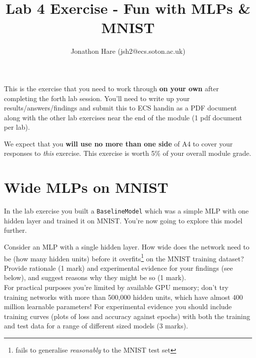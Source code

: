 \documentclass[a4paper]{article}
\begin{document}
\lstset{language=Python,upquote=true}

\setlength{\leftskip}{20pt}
\title{Lab 4 Exercise - Fun with MLPs \& MNIST}
\author{Jonathon Hare (jsh2@ecs.soton.ac.uk)}

\maketitle


This is the exercise that you need to work through \textbf{on your own} after completing the forth lab session. You'll need to write up your results/answers/findings and submit this to ECS handin as a PDF document along with the other lab exercises near the end of the module (1 pdf document per lab). 

We expect that you \textbf{will use no more than one side} of A4 to cover your responses to \emph{this} exercise. This exercise is worth 5\% of your overall module grade.

\section{Wide MLPs on MNIST}\label{wide}

In the lab exercise you built a \texttt{BaselineModel} which was a simple MLP with one hidden layer and trained it on MNIST. You're now going to explore this model further.

\begin{tcolorbox}[title=1.1 Wider MLPs (5 marks)]
Consider an MLP with a single hidden layer. How wide does the network need to be (how many hidden units) before it overfits\footnote{fails to generalise \emph{reasonably} to the MNIST test set} on the MNIST training dataset? Provide rationale (1 mark) and experimental evidence for your findings (see below), and suggest reasons why they might be so (1 mark).
\\[1em]
For practical purposes you're limited by available GPU memory; don't try training networks with more than 500,000 hidden units, which have almost 400 million learnable parameters! For experimental evidence you should include training curves (plots of loss and accuracy against epochs) with both the training and test data for a range of different sized models (3 marks).
\end{tcolorbox}
\end{document}
